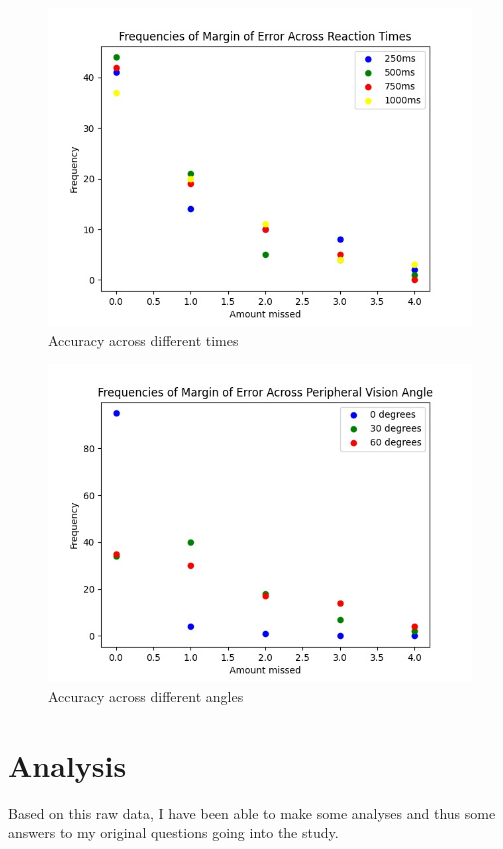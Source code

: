 \documentclass[12pt]{article}
\begin{document}
\begin{figure} [h]
\centering
\includegraphics[scale=0.5]{reaction.jpg}
\caption{Accuracy across different times}
\end{figure}

\begin{figure} [h]
\centering
\includegraphics[scale=0.5]{angle.jpg}
\caption{Accuracy across different angles}
\end{figure}

\newpage
\section{Analysis}

Based on this raw data, I have been able to make some analyses and thus some
answers to my original questions going into the study.
\end{document}
